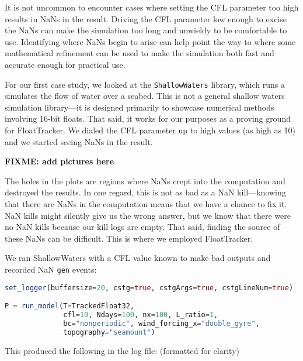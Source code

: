 \documentclass{juliacon}
\begin{document}

It is not uncommon to encounter cases where setting the CFL parameter too high results in NaNs in the result.
Driving the CFL parameter low enough to excise the NaNs can make the simulation too long and unwieldy to be comfortable to use.
Identifying where NaNs begin to arise can help point the way to where some mathematical refinement can be used to make the simulation both fast and accurate enough for practical use.

For our first case study, we looked at the \texttt{ShallowWaters} library,\cite{klowerNumberFormatsError2020,klowerPositsAlternativeFloats2019,klowerLowprecisionClimateComputing2021} which runs a simulates the flow of water over a seabed.
This is not a general shallow waters simulation library---it is designed primarily to showcase numerical methods involving 16-bit floats.
That said, it works for our purposes as a proving ground for FloatTracker.
We dialed the CFL parameter up to high values (as high as 10) and we started seeing NaNs in the result.

\textbf{FIXME: add pictures here}

The holes in the plots are regions where NaNs crept into the computation and destroyed the results.
In one regard, this is not as bad as a NaN kill---knowing that there are NaNs in the computation means that we have a chance to fix it.
NaN kills might silently give us the wrong answer, but we know that there were no NaN kills because our kill logs are empty.
That said, finding the source of these NaNs can be difficult.
This is where we employed FloatTracker.

We ran ShallowWaters with a CFL value known to make bad outputs and recorded NaN \texttt{gen} events:

\begin{lstlisting}[language = Julia]
set_logger(buffersize=20, cstg=true, cstgArgs=true, cstgLineNum=true)

P = run_model(T=TrackedFloat32,
              cfl=10, Ndays=100, nx=100, L_ratio=1,
              bc="nonperiodic", wind_forcing_x="double_gyre",
              topography="seamount")
\end{lstlisting}

This produced the following in the log file: (formatted for clarity)
\end{document}
